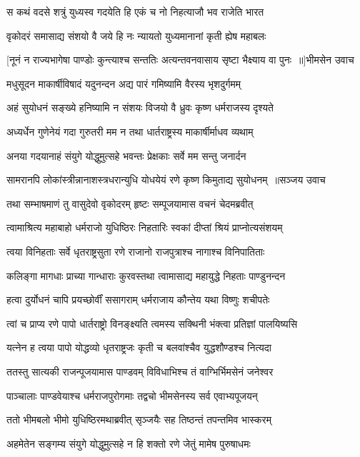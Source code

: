 \twolineshloka
{स कथं वदसे शत्रुं युध्यस्व गदयेति हि}
{एकं च नो निहत्याजौ भव राजेति भारत}


\twolineshloka
{वृकोदरं समासाद्य संशयो वै जये हि नः}
{न्यायतो युध्यमानानां कृती ह्येष महाबलः}


\threelineshloka
{[नूनं न राज्यभागेषा पाण्डोः कुन्त्याश्च सन्ततिः}
{अत्यन्तवनवासाय सृष्टा भैक्ष्याय वा पुनः ॥]भीमसेन उवाच}
{}


\twolineshloka
{मधुसूदन माकार्षीविषादं यदुनन्दन}
{अद्य पारं गमिष्यामि वैरस्य भृशदुर्गमम्}


\twolineshloka
{अहं सुयोधनं सङ्ख्ये हनिष्यामि न संशयः}
{विजयो वै ध्रुवः कृष्ण धर्मराजस्य दृश्यते}


\twolineshloka
{अध्यर्धेन गुणेनेयं गदा गुरुतरी मम}
{न तथा धार्तराष्ट्रस्य माकार्षीर्माधव व्यथाम्}


\twolineshloka
{अनया गदयानाहं संयुगे योद्धुमुत्सहे}
{भवन्तः प्रेक्षकाः सर्वे मम सन्तु जनार्दन}


\threelineshloka
{सामरानपि लोकांस्त्रीन्नानाशस्त्रधरान्युधि}
{योधयेयं रणे कृष्ण किमुताद्य सुयोधनम् ॥सञ्जय उवाच}
{}


\twolineshloka
{तथा सम्भाषमाणं तु वासुदेवो वृकोदरम्}
{हृष्टः सम्पूजयामास वचनं चेदमब्रवीत्}


\twolineshloka
{त्वामाश्रित्य महाबाहो धर्मराजो युधिष्ठिरः}
{निहतारिः स्वकां दीप्तां श्रियं प्राप्नोत्यसंशयम्}


\twolineshloka
{त्वया विनिहताः सर्वे धृतराष्ट्रसुता रणे}
{राजानो राजपुत्राश्च नागाश्च विनिपातिताः}


\twolineshloka
{कलिङ्गा मागधाः प्राच्या गान्धाराः कुरवस्तथा}
{त्वामासाद्य महायुद्धे निहताः पाण्डुनन्दन}


\twolineshloka
{हत्वा दुर्योधनं चापि प्रयच्छोर्वीं ससागराम्}
{धर्मराजाय कौन्तेय यथा विष्णुः शचीपतेः}


\twolineshloka
{त्वां च प्राप्य रणे पापो धार्तराष्ट्रो विनङ्क्ष्यति}
{त्वमस्य सक्थिनी भंक्त्वा प्रतिज्ञां पालयिष्यसि}


\twolineshloka
{यत्नेन ह त्वया पापो योद्धव्यो धृतराष्ट्रजः}
{कृती च बलवांश्चैव युद्धशौण्डश्च नित्यदा}


\twolineshloka
{ततस्तु सात्यकी राजन्पूजयामास पाण्डवम्}
{विविधाभिश्च तं वाग्भिर्भिमसेनं जनेश्वर}


\twolineshloka
{पाञ्चालाः पाण्डवेयाश्च धर्मराजपुरोगमाः}
{तद्वचो भीमसेनस्य सर्व एवाभ्यपूजयन्}


\twolineshloka
{ततो भीमबलो भीमो युधिष्ठिरमथाब्रवीत्}
{सृञ्जयैः सह तिष्ठन्तं तपन्तमिव भास्करम्}


\twolineshloka
{अहमेतेन सङ्गम्य संयुगे योद्धुमुत्सहे}
{न हि शक्तो रणे जेतुं मामेष पुरुषाधमः}


